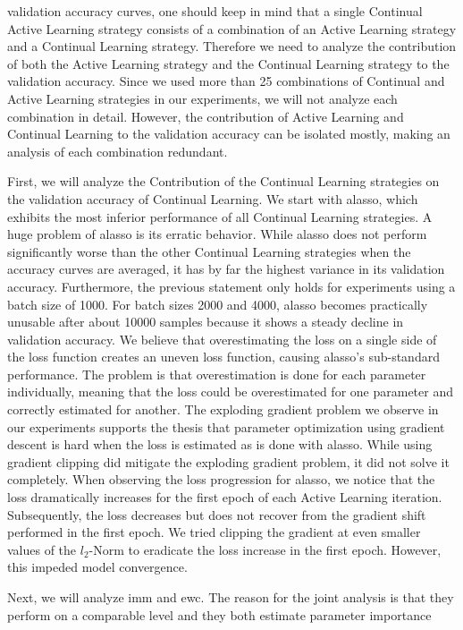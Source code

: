 validation accuracy curves, one should keep in mind that a single Continual Active Learning strategy consists of a combination of an Active Learning
strategy and a Continual Learning strategy. Therefore we need to analyze the contribution of both the Active Learning strategy and the Continual Learning
strategy to the validation accuracy. Since we used more than 25 combinations of Continual and Active Learning strategies in our experiments, we will not
analyze each combination in detail. However, the contribution of Active Learning and Continual Learning to the validation
accuracy can be isolated mostly, making an analysis of each combination redundant. \par
First, we will analyze the Contribution of the Continual Learning strategies on the validation accuracy of Continual Learning. We start with \gls{alasso},
which exhibits the most inferior performance of all Continual Learning strategies. A huge problem of \gls{alasso} is its erratic behavior. While
\gls{alasso} does not perform significantly worse than the other Continual Learning strategies when the accuracy curves are averaged, it has by far the highest
variance in its validation accuracy. Furthermore, the previous statement only holds for experiments using a batch size of 1000. For batch sizes 2000 and 4000,
\gls{alasso} becomes practically unusable after about 10000 samples because it shows a steady decline in validation accuracy. We believe that overestimating the
loss on a single side of the loss function creates an uneven loss function, causing \gls{alasso}'s sub-standard performance. The problem is that overestimation is
done for each parameter individually, meaning that the loss could be overestimated for one parameter and correctly estimated for another. The exploding gradient problem we observe
in our experiments supports the thesis that parameter optimization using gradient descent is hard when the loss is estimated as is done with \gls{alasso}. 
While using gradient clipping did mitigate the exploding gradient problem, it did not solve it completely. When observing the loss progression for \gls{alasso},
we notice that the loss dramatically increases for the first epoch of each Active Learning iteration. Subsequently, the loss decreases but does not recover
from the gradient shift performed in the first epoch. We tried clipping the gradient at even smaller values of the $l_2$-Norm to eradicate the loss increase in
the first epoch. However, this impeded model convergence. \par
Next, we will analyze \gls{imm} and \gls{ewc}. The reason for the joint analysis is that they perform on a comparable level and they both estimate parameter importance
